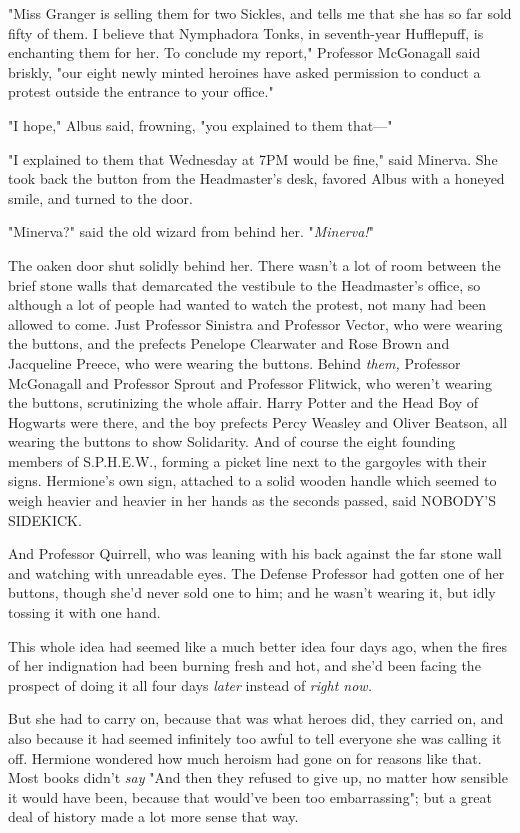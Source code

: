 "Miss Granger is selling them for two Sickles, and tells me that she has so far 
sold fifty of them. I believe that Nymphadora Tonks, in seventh-year 
Hufflepuff, is enchanting them for her. To conclude my report," Professor 
McGonagall said briskly, "our eight newly minted heroines have asked permission 
to conduct a protest outside the entrance to your office."

"I hope," Albus said, frowning, "you explained to them that---"

"I explained to them that Wednesday at 7PM would be fine," said Minerva. She 
took back the button from the Headmaster's desk, favored Albus with a honeyed 
smile, and turned to the door.

"Minerva?" said the old wizard from behind her. "\emph{Minerva!}"

The oaken door shut solidly behind her.
\sbreak
There wasn't a lot of room between the brief stone walls that demarcated the 
vestibule to the Headmaster's office, so although a lot of people had wanted to 
watch the protest, not many had been allowed to come. Just Professor Sinistra 
and Professor Vector, who were wearing the buttons, and the prefects Penelope 
Clearwater and Rose Brown and Jacqueline Preece, who were wearing the buttons. 
Behind \emph{them,} Professor McGonagall and Professor Sprout and Professor 
Flitwick, who weren't wearing the buttons, scrutinizing the whole affair. Harry 
Potter and the Head Boy of Hogwarts were there, and the boy prefects Percy 
Weasley and Oliver Beatson, all wearing the buttons to show Solidarity. And of 
course the eight founding members of S.P.H.E.W., forming a picket line next to 
the gargoyles with their signs. Hermione's own sign, attached to a solid wooden 
handle which seemed to weigh heavier and heavier in her hands as the seconds 
passed, said NOBODY'S SIDEKICK.

And Professor Quirrell, who was leaning with his back against the far stone 
wall and watching with unreadable eyes. The Defense Professor had gotten one of 
her buttons, though she'd never sold one to him; and he wasn't wearing it, but 
idly tossing it with one hand.

This whole idea had seemed like a much better idea four days ago, when the 
fires of her indignation had been burning fresh and hot, and she'd been facing 
the prospect of doing it all four days \emph{later} instead of \emph{right now.}

But she had to carry on, because that was what heroes did, they carried on, and 
also because it had seemed infinitely too awful to tell everyone she was 
calling it off. Hermione wondered how much heroism had gone on for reasons like 
that. Most books didn't \emph{say} "And then they refused to give up, no matter 
how sensible it would have been, because that would've been too embarrassing"; 
but a great deal of history made a lot more sense that way.

